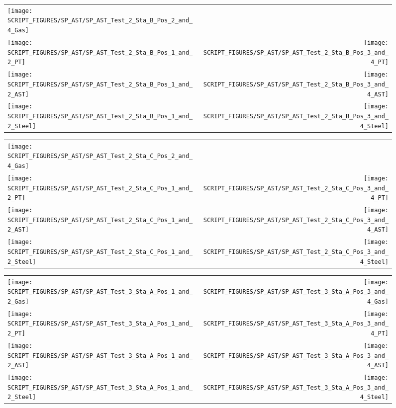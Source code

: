 \begin{figure}[p]
\begin{tabular*}{\textwidth}{l@{\extracolsep{\fill}}r}
\texttt{[image: SCRIPT\_FIGURES/SP\_AST/SP\_AST\_Test\_2\_Sta\_B\_Pos\_2\_and\_4\_Gas]} &
  \\
\texttt{[image: SCRIPT\_FIGURES/SP\_AST/SP\_AST\_Test\_2\_Sta\_B\_Pos\_1\_and\_2\_PT]} &
\texttt{[image: SCRIPT\_FIGURES/SP\_AST/SP\_AST\_Test\_2\_Sta\_B\_Pos\_3\_and\_4\_PT]} \\
\texttt{[image: SCRIPT\_FIGURES/SP\_AST/SP\_AST\_Test\_2\_Sta\_B\_Pos\_1\_and\_2\_AST]} &
\texttt{[image: SCRIPT\_FIGURES/SP\_AST/SP\_AST\_Test\_2\_Sta\_B\_Pos\_3\_and\_4\_AST]} \\
\texttt{[image: SCRIPT\_FIGURES/SP\_AST/SP\_AST\_Test\_2\_Sta\_B\_Pos\_1\_and\_2\_Steel]} &
\texttt{[image: SCRIPT\_FIGURES/SP\_AST/SP\_AST\_Test\_2\_Sta\_B\_Pos\_3\_and\_4\_Steel]}
\end{tabular*}
\label{SP_Test_2_Station_B}
\end{figure}

\begin{figure}[p]
\begin{tabular*}{\textwidth}{l@{\extracolsep{\fill}}r}
\texttt{[image: SCRIPT\_FIGURES/SP\_AST/SP\_AST\_Test\_2\_Sta\_C\_Pos\_2\_and\_4\_Gas]} &
  \\
\texttt{[image: SCRIPT\_FIGURES/SP\_AST/SP\_AST\_Test\_2\_Sta\_C\_Pos\_1\_and\_2\_PT]} &
\texttt{[image: SCRIPT\_FIGURES/SP\_AST/SP\_AST\_Test\_2\_Sta\_C\_Pos\_3\_and\_4\_PT]} \\
\texttt{[image: SCRIPT\_FIGURES/SP\_AST/SP\_AST\_Test\_2\_Sta\_C\_Pos\_1\_and\_2\_AST]} &
\texttt{[image: SCRIPT\_FIGURES/SP\_AST/SP\_AST\_Test\_2\_Sta\_C\_Pos\_3\_and\_4\_AST]} \\
\texttt{[image: SCRIPT\_FIGURES/SP\_AST/SP\_AST\_Test\_2\_Sta\_C\_Pos\_1\_and\_2\_Steel]} &
\texttt{[image: SCRIPT\_FIGURES/SP\_AST/SP\_AST\_Test\_2\_Sta\_C\_Pos\_3\_and\_4\_Steel]}
\end{tabular*}
\label{SP_Test_2_Station_C}
\end{figure}


\begin{figure}[p]
\begin{tabular*}{\textwidth}{l@{\extracolsep{\fill}}r}
\texttt{[image: SCRIPT\_FIGURES/SP\_AST/SP\_AST\_Test\_3\_Sta\_A\_Pos\_1\_and\_2\_Gas]} &
\texttt{[image: SCRIPT\_FIGURES/SP\_AST/SP\_AST\_Test\_3\_Sta\_A\_Pos\_3\_and\_4\_Gas]} \\
\texttt{[image: SCRIPT\_FIGURES/SP\_AST/SP\_AST\_Test\_3\_Sta\_A\_Pos\_1\_and\_2\_PT]} &
\texttt{[image: SCRIPT\_FIGURES/SP\_AST/SP\_AST\_Test\_3\_Sta\_A\_Pos\_3\_and\_4\_PT]} \\
\texttt{[image: SCRIPT\_FIGURES/SP\_AST/SP\_AST\_Test\_3\_Sta\_A\_Pos\_1\_and\_2\_AST]} &
\texttt{[image: SCRIPT\_FIGURES/SP\_AST/SP\_AST\_Test\_3\_Sta\_A\_Pos\_3\_and\_4\_AST]} \\
\texttt{[image: SCRIPT\_FIGURES/SP\_AST/SP\_AST\_Test\_3\_Sta\_A\_Pos\_1\_and\_2\_Steel]} &
\texttt{[image: SCRIPT\_FIGURES/SP\_AST/SP\_AST\_Test\_3\_Sta\_A\_Pos\_3\_and\_4\_Steel]}
\end{tabular*}
\label{SP_Test_3_Station_A}
\end{figure}

